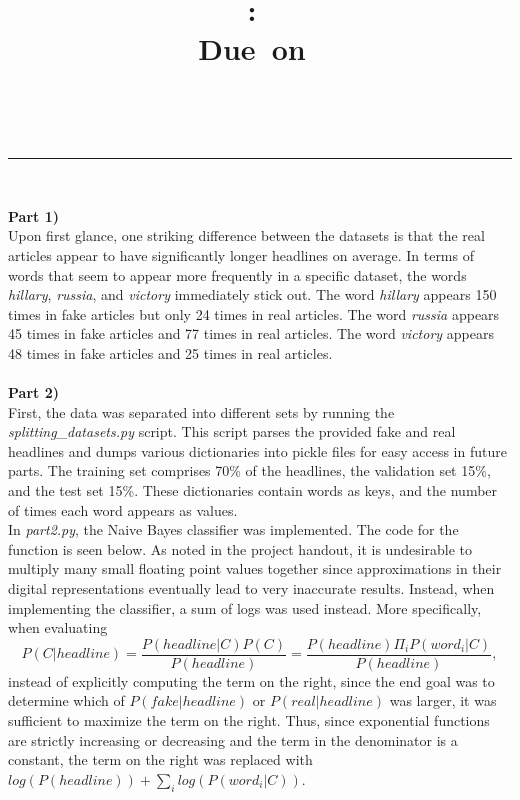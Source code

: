 \documentclass{article}
\title{
\vspace{2in}
\textmd{\textbf{\hmwkClass:\ \hmwkTitle}}\\
\normalsize\vspace{0.1in}\small{Due\ on\ \hmwkDueDate}\\
\vspace{0.1in}
\vspace{3in}
}
\author{\textbf{\hmwkAuthorName}}
\date{} %
\makeatletter
\newcommand{\linia}{\rule{\linewidth}{0.5pt}}
\theoremstyle{mytheor}
\theoremstyle{definition}
\renewcommand{\maketitle}{
\begin{center}
\vspace{2ex}
{\huge \textsc{\@title}}
\vspace{1ex}
\\
\linia\\
\@author \hfill \@date
\vspace{4ex}
\end{center}
}
\makeatother
\begin{document}
 \maketitle \clearpage

\textbf{Part 1)}\\
Upon first glance, one striking difference between the datasets is that the real articles appear to have significantly longer headlines on average. In terms of words that seem to appear more frequently in a specific dataset, the words \textit{hillary}, \textit{russia}, and \textit{victory} immediately stick out. The word \textit{hillary} appears 150 times in fake articles but only 24 times in real articles. The word \textit{russia} appears 45 times in fake articles and 77 times in real articles. The word \textit{victory} appears 48 times in fake articles and 25 times in real articles.\\\\
\textbf{Part 2)}\\
First, the data was separated into different sets by running the \textit{splitting\_datasets.py} script. This script parses the provided fake and real headlines and dumps various dictionaries into pickle files for easy access in future parts. The training set comprises 70\% of the headlines, the validation set 15\%, and the test set 15\%. These dictionaries contain words as keys, and the number of times each word appears as values.\\

In \textit{part2.py}, the Naive Bayes classifier was implemented. The code for the function is seen below. As noted in the project handout, it is undesirable to multiply many small floating point values together since approximations in their digital representations eventually lead to very inaccurate results. Instead, when implementing the classifier, a sum of logs was used instead. More specifically, when evaluating $$P(C|headline)=\frac{P(headline|C)P(C)}{P(headline)}=\frac{P(headline)\Pi_{i}P(word_i|C)}{P(headline)},$$ instead of explicitly computing the term on the right, since the end goal was to determine which of $P(fake|headline)$ or $P(real|headline)$ was larger, it was sufficient to maximize the term on the right. Thus, since exponential functions are strictly increasing or decreasing and the term in the denominator is a constant, the term on the right was replaced with 
$log(P(headline))+\sum_{i}log(P(word_i|C))$.\\
\end{document}
